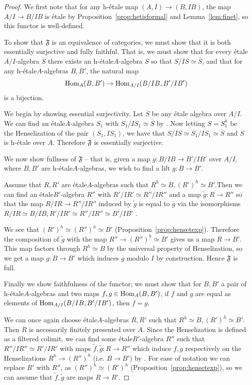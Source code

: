 \documentclass[12pt]{article}
\newcommand{\Hom}{{\rm Hom}}
\newcommand{\ol}[1]{\overline{#1}}
\newcommand{\mf}[1]{\mathfrak{#1}}
\newcommand{\Et}{\'etale\xspace}
\newcommand{\hetale}{h-\'etale\xspace}
\newcommand{\spcite}[2]{\cite[\href{https://stacks.math.columbia.edu/tag/#1}{{#2} {#1}}]{stackp}}
\theoremstyle{definition}
\numberwithin{equation}{subsection}
\begin{document}
\begin{proof} We first note that for any \hetale map $(A,I) \to (B,IB)$, the map $A/I \to B/IB$ is  \Et by Proposition~\ref{prop:hetisformal} and Lemma~\ref{lem:finet}, so this functor is well-defined. 

To show that $\mf{F}$ is  an equivalence of categories, we must show that it is both essentially surjective and fully faithful. That is, we must show that for every \Et $A/I$-algebra $\ol{S}$ there exists an \hetale $A$-algebra $S$ so that $S/IS \simeq \ol{S}$, and that for any \hetale $A$-algebras $B,B'$, the natural map $$\Hom_A(B,B') \to \Hom_{A/I}(B/IB,B'/IB')$$ is a bijection.

We begin by showing essential surjectivity. Let $\ol{S}$ be any \Et algebra over $A/I$. We can find an \Et $A$-algebra $S_1$ with $S_1/IS_1 \simeq \ol{S}$ by \spcite{04D1}{Lemma}. Now letting $S = S_1^h$ be the Henselization of the pair $(S_1,IS_1)$, we have that $S/IS \simeq S_1/IS_1 \simeq \ol{S}$ and $S$ is \hetale over $A$. Therefore $\mf{F}$ is essentially surjective. 

We now show fullness of $\mf{F}$ -- that is, given a map $\ol{g}: B/IB \to B'/IB'$ over $A/I$, where $B,B'$ are \hetale $A$-algebras, we wish to find a lift $g: B \to B'$. 

Assume that $R,R'$ are \Et $A$-algebras such that $R^h \simeq B, (R')^h \simeq B'$.Then we can find an \Et $R'$-algebra $R''$ with $R'/IR' \simeq R''/IR''$ and a map $\widetilde{g}: R \to R''$ so that the map $R/IR \to R''/IR''$ induced by $\widetilde{g}$ is equal to $\ol{g}$ via the isomorphisms $R/IR \simeq B/IB, R'/IR' \simeq R''/IR'' \simeq B'/IB'$ \cite[Corollary 2.1.3]{arabia}. 

We see that $(R')^h \simeq (R'')^h \simeq B'$ (Proposition~\ref{prop:hensetexp}). Therefore  the composition of $\widetilde{g}$ with the map $R'' \to (R'')^h \simeq B'$ gives us a map $R \to B'$. This map factors through $R^h \simeq B$ by the universal property of Henselization, so we get a map $g: B \to B'$  which  induces $\ol{g}$ modulo $I$ by construction. Hence $\mf{F}$ is full.

Finally we show faithfulness of the functor; we must show that for $B,B'$ a pair of \hetale $A$-algebras and two maps $f,g \in \Hom_A(B,B')$, if $f$ and $g$ are equal as elements of $\Hom_{A/I}(B/IB,B'/IB')$, then  $f=g$. 

We can once again choose \Et $A$-algebras $R,R'$ such that $R^h \simeq B, (R')^h \simeq B'$. Then $R$ is necessarily finitely presented over $A$. Since the Henselization is defined as a filtered colimit, we can find some \Et $R'$-algebra $R''$ such that $R''/IR'' \simeq R'/IR'$ with maps $\widetilde{f},\widetilde{g}: R \to R''$ which induce $f,g$ respectively on the Henselizations $R^h \to (R'')^h$ (i.e. $ B \to B'$) by \spcite{00QO}{Lemma}.  For ease of notation we can replace $R'$ with $R''$, as $(R'')^h \simeq (R')^h$ (Proposition~\ref{prop:hensetexp}), so we can assume that $\widetilde{f},\widetilde{g}$ are maps $R \to R'$. 


\end{proof}
\end{document}
